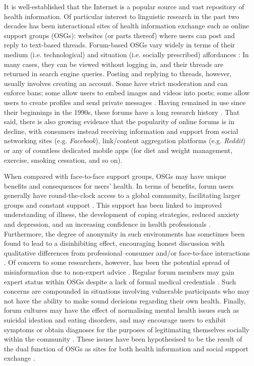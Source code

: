 \documentclass{article}
\renewcommand{\cite}{\parencite}
\begin{document}
	It is well-established that the Internet is a popular source and vast repository of health information. Of particular interest to linguistic research in the past two decades has been interactional sites of health information exchange such as online support groups (OSGs): websites (or parts thereof) where users can post and reply to text-based threads. Forum-based OSGs vary widely in terms of their medium (i.e. technological) and situation (i.e. socially prescribed) affordances \cite{herring_faceted_2007}: In many cases, they can be viewed without logging in, and their threads are returned in search engine queries. Posting and replying to threads, however, usually involves creating an account. Some have strict moderation and can enforce bans; some allow users to embed images and videos into posts; some allow users to create profiles and send private messages \cite{morzy_analysis_2012}. Having remained in use since their beginnings in the 1990s, these forums have a long research history \cite[e.g.][]{sharf_communicating_1997}. That said, there is also growing evidence that the popularity of online forums is in decline, with consumers instead receiving information and support from social networking sites (e.g. \emph{Facebook}), link\slash content aggregation platforms (e.g. \emph{Reddit}) or any of countless dedicated mobile apps (for diet and weight management, exercise, smoking cessation, and so on).

	When compared with face-to-face support groups, OSGs may have unique benefits and consequences for users' health. In terms of benefits, forum users generally have round-the-clock access to a global community, facilitating larger groups and constant support \cite{stommel_online_2010,stommel_use_2011}. This support has been linked to improved understanding of illness, the development of coping strategies, reduced anxiety and depression, and an increasing confidence in health professionals \cite{mulveen_interpretative_2006,swan_sharing_2010,manchaiah_use_2013,yao_impact_2015}. Furthermore, the degree of anonymity in such environments has sometimes been found to lead to a disinhibiting effect, encouraging honest discussion \cite{mo_are_2013} with qualitative differences from professional--consumer and\slash or face-to-face interactions \cite{maclean_forum77:_2015}. Of concern to some researchers, however, has been the potential spread of misinformation due to non-expert advice \cite{ziebland_how_2004}. Regular forum members may gain expert status within OSGs despite a lack of formal medical credentials \cite{hardey_doctor_1999,thompson_credibility_2012}. Such concerns are compounded in situations involving vulnerable participants who may not have the ability to make sound decisions regarding their own health.
	Finally, forum cultures may have the effect of normalising mental health issues such as suicidal ideation and eating disorders, and may encourage users to exhibit symptoms or obtain diagnoses for the purposes of legitimating themselves socially within the community \cite{horne_doing_2009,vayreda_social_2009}. These issues have been hypothesised to be the result of the dual function of OSGs as sites for both health information and social support exchange \cite{nambisan_information_2011,attard_thematic_2012}.
\end{document}
